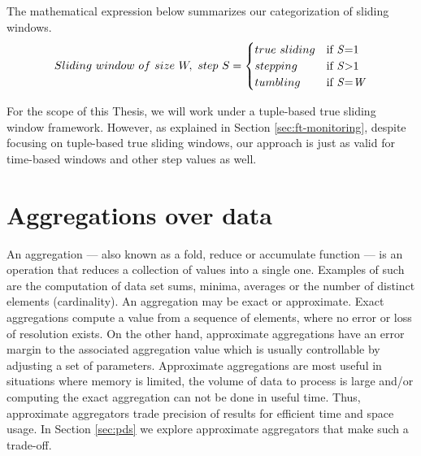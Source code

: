 The mathematical expression below summarizes our categorization of sliding windows.
\begin{equation} 
\label{math:windows}
  Sliding\ window \,\, of \,\, size \,\, W, \,\, step \,\, S =
    \begin{cases}
      true \,\, sliding & \text{if \textit{S}=1}\\
      stepping & \text{if \textit{S}>1}\\
      tumbling & \text{if \textit{S}=\textit{W}}
    \end{cases}
\end{equation}

For the scope of this Thesis, we will work under a tuple-based true sliding window framework. However, as explained in Section \ref{sec:ft-monitoring}, despite focusing on tuple-based true sliding windows, our approach is just as valid for time-based windows and other step values as well.

\section{Aggregations over data} \label{sec:aggregations}

An aggregation --- also known as a fold, reduce or accumulate function --- is an operation that reduces a collection of values into a single one. Examples of such are the computation of data set sums, minima, averages or the number of distinct elements (cardinality). An aggregation may be exact or approximate. Exact aggregations compute a value from a sequence of elements, where no error or loss of resolution exists. On the other hand, approximate aggregations have an error margin to the associated aggregation value which is usually controllable by adjusting a set of parameters. 
Approximate aggregations are most useful in situations where memory is limited, the volume of data to process is large and/or computing the exact aggregation can not be done in useful time. Thus, approximate aggregators trade precision of results for efficient time and space usage. In Section \ref{sec:pds} we explore approximate aggregators that make such a trade-off.

